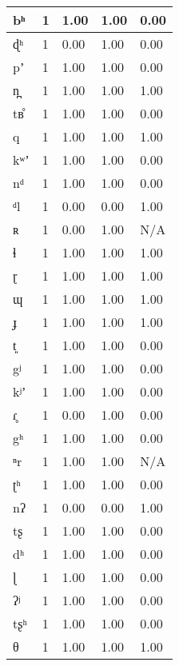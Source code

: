 \begin{longtable}{|l|l|l|l|l|}
bʰ      & 1     & 1.00    & 1.00   & 0.00  \\ \hline
ɖʰ      & 1     & 0.00    & 1.00   & 0.00  \\ \hline
pʼ      & 1     & 1.00    & 1.00   & 0.00  \\ \hline
n̪      & 1     & 1.00    & 1.00   & 1.00  \\ \hline
tʙ̊     & 1     & 1.00    & 1.00   & 0.00  \\ \hline
q       & 1     & 1.00    & 1.00   & 1.00  \\ \hline
kʷʼ     & 1     & 1.00    & 1.00   & 0.00  \\ \hline
nᵈ      & 1     & 1.00    & 1.00   & 0.00  \\ \hline
ᵈl      & 1     & 0.00    & 0.00   & 1.00  \\ \hline
ʀ       & 1     & 0.00    & 1.00   & N/A   \\ \hline
ɬ       & 1     & 1.00    & 1.00   & 1.00  \\ \hline
ɽ       & 1     & 1.00    & 1.00   & 1.00  \\ \hline
ɰ       & 1     & 1.00    & 1.00   & 1.00  \\ \hline
ɟ       & 1     & 1.00    & 1.00   & 1.00  \\ \hline
t͈      & 1     & 1.00    & 1.00   & 0.00  \\ \hline
gʲ      & 1     & 1.00    & 1.00   & 0.00  \\ \hline
kʲʼ     & 1     & 1.00    & 1.00   & 0.00  \\ \hline
ɾ̥      & 1     & 0.00    & 1.00   & 0.00  \\ \hline
gʰ      & 1     & 1.00    & 1.00   & 0.00  \\ \hline
ⁿr      & 1     & 1.00    & 1.00   & N/A   \\ \hline
ʈʰ      & 1     & 1.00    & 1.00   & 0.00  \\ \hline
nʔ      & 1     & 0.00    & 0.00   & 1.00  \\ \hline
tʂ      & 1     & 1.00    & 1.00   & 0.00  \\ \hline
dʰ      & 1     & 1.00    & 1.00   & 0.00  \\ \hline
ɭ       & 1     & 1.00    & 1.00   & 0.00  \\ \hline
ʔʲ      & 1     & 1.00    & 1.00   & 0.00  \\ \hline
tʂʰ     & 1     & 1.00    & 1.00   & 0.00  \\ \hline
θ       & 1     & 1.00    & 1.00   & 1.00  \\ \hline

\end{longtable}
